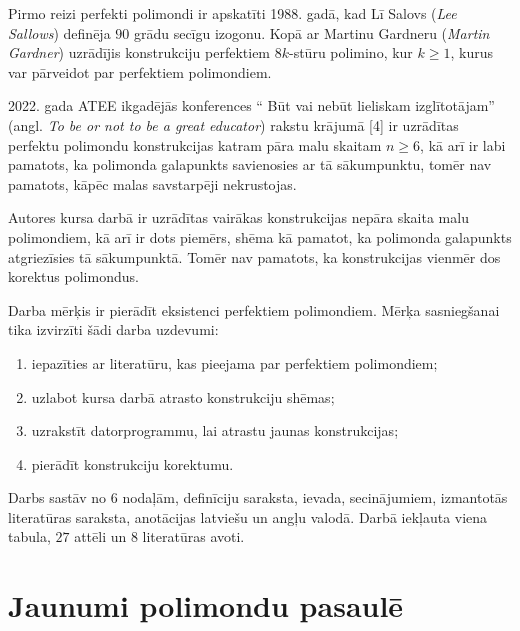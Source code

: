 \documentclass[utf8]{ludis2022}
\begin{document}
\firstparskip Pirmo reizi perfekti polimondi ir apskatīti  1988. gadā, kad Lī Salovs ({\em Lee Sallows}) definēja $90$ grādu secīgu izogonu. Kopā ar Martinu Gardneru ({\em Martin Gardner}) uzrādījis konstrukciju perfektiem $8k$-stūru polimino, kur $k \geq 1$, kurus var pārveidot par perfektiem polimondiem. 


2022. gada ATEE ikgadējās konferences ``
Būt vai nebūt lieliskam izglītotājam'' (angl. {\em To be or not to be a great educator}) rakstu krājumā 
[4] ir uzrādītas perfektu polimondu konstrukcijas katram pāra malu skaitam $n\geq 6$, kā arī ir labi pamatots, ka polimonda galapunkts savienosies ar tā sākumpunktu, tomēr nav pamatots, kāpēc malas savstarpēji nekrustojas. 

Autores kursa darbā ir uzrādītas vairākas konstrukcijas nepāra skaita malu polimondiem, kā arī ir dots piemērs, shēma kā pamatot, ka polimonda galapunkts atgriezīsies tā sākumpunktā. Tomēr nav pamatots, ka konstrukcijas vienmēr dos korektus polimondus. 


Darba mērķis ir pierādīt eksistenci perfektiem polimondiem. Mērķa sasniegšanai tika izvirzīti šādi darba uzdevumi:

\vspace{-15pt}
\begin{enumerate}
\item iepazīties ar literatūru, kas pieejama par perfektiem polimondiem;
\vspace{-10pt}
\item uzlabot kursa darbā atrasto konstrukciju shēmas;
\vspace{-10pt}
\item uzrakstīt datorprogrammu, lai atrastu jaunas konstrukcijas;
\vspace{-10pt}
\item pierādīt konstrukciju korektumu.
\vspace{-10pt}
\end{enumerate}


Darbs sastāv no $6$ nodaļām, definīciju saraksta, ievada, secinājumiem, izmantotās literatūras saraksta, anotācijas latviešu un angļu valodā. Darbā iekļauta viena tabula, $27$ attēli un $8$ literatūras avoti.


\newpage

\section{Jaunumi polimondu pasaulē}
\end{document}

